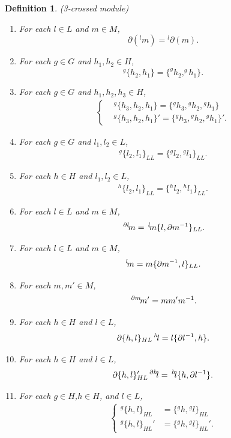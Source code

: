 \documentclass{tac}
\newtheorem{dfn}{Definition}
\newcommand{\act}[1]{\,\sp{#1}\!}
\newcommand{\del}{\partial}
\begin{document}
\begin{dfn}{(3-crossed module)}
\begin{enumerate}
\begin{align*}
\left\{
    \begin{aligned}
    & \partial({}^hl)= {{}^h}\partial(l)  \\
    & \partial({}^hm)= {{}^h}\partial(m) .
    \end{aligned}
\right.
\end{align*}
  \item For each $l \in L$ and $m \in M$,
\[
\partial({}^lm)= {{}^l}\partial(m).
\]
  \item For each $g\in G$ and $h_1,h_2 \in H$,
  \[
   ^g \{h_2,h_1\} = \{^g h_2,^g h_1\} .
  \]
  \item For each $g\in G$ and $h_1,h_2,h_3 \in H$,
  \begin{align*}
\left\{
    \begin{aligned}
   &{}^g \{h_3,h_2,h_1\} = \{{}^g h_3,{}^g h_2, {}^g h_1\}\\
   &{}^g \{h_3,h_2,h_1\}' = \{{}^g h_3,{}^g h_2, {}^g h_1\}'. 
    \end{aligned}
\right.
\end{align*}
  \item For each $g\in G$ and $l_1,l_2 \in L$,
  \begin{align*}
{}^g \{l_2,l_1\}_{LL} = \{{}^g l_2,{}^g l_1\}_{LL}.
\end{align*}
 \item For each $h\in H$ and $l_1,l_2 \in L$,
  \begin{align*}
{}^h \{l_2,l_1\}_{LL} = \{{}^h l_2,{}^h l_1\}_{LL}.
\end{align*}

\item For each $l\in L$ and $m \in M$,
 \[
 \act{\del l}m = \act{l}m\{l,\partial m^{-1}\}_{LL}  .
 \] 
\label{act_u_ll_dellm}
\item For each $l\in L$ and $m \in M$,
 \[
 \act{l}m = m\{\partial m^{-1}, l\}_{LL} .
 \] 
\label{act_u_ll_lm}
  \item For each $m,m'\in M$,
  \[
  \act{\partial m}m' = mm'm^{-1} .
  \]
\label{act_delm_m_3cm}

  \item For each $h\in H$ and $l \in L$,
  \[
  \partial\{h,l\}_{HL}\act{h}l = l\{\partial l^{-1},h\}.
  \]
  \label{dhl}
  
    \item For each $h\in H$ and $l \in L$,
  \[
  \partial\{h,l\}'_{HL}\act{\partial h}l = \act{h}l\{h,\partial l^{-1}\}.
  \]
\label{dhlp}

  \item For each $g\in H$,$h\in H$, and $l \in L$,
  \begin{align*}
\left\{
    \begin{aligned}
{}^g \{h,l\}_{HL} &= \{{}^g h, {}^g l\}_{HL}\\
{}^g \{h,l\}_{HL}' &= \{{}^g h, {}^g l\}_{HL}'.
    \end{aligned}
\right.
\end{align*}


\end{enumerate}
\end{dfn}
\end{document}

